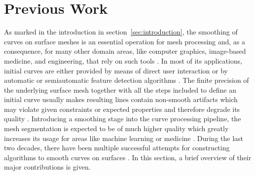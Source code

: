 \documentclass{stdlocal}
\begin{document}
\section{Previous Work} %
\label{sec:previous_work}

  As marked in the introduction in section~\ref{sec:introduction}, the smoothing of curves on surface meshes is an essential operation for mesh processing and, as a consequence, for many other domain areas, like computer graphics, image-based medicine, and engineering, that rely on such tools \autocite{ji2006,kaplansky2009}.
  In most of its applications, initial curves are either provided by means of direct user interaction or by automatic or semiautomatic feature detection algorithms \autocite{zachow2003,lawonn2014}.
  The finite precision of the underlying surface mesh together with all the steps included to define an initial curve usually makes resulting lines contain non-smooth artifacts which may violate given constraints or expected properties and therefore degrade its quality \autocite{kaplansky2009,lawonn2014}.
  Introducing a smoothing stage into the curve processing pipeline, the mesh segmentation is expected to be of much higher quality which greatly increases its usage for areas like machine learning \autocite{benhabiles2011} or medicine \autocite{zachow2003,alirr2019}.
  During the last two decades, there have been multiple successful attempts for constructing algorithms to smooth curves on surfaces \autocite{hofer2004,bischoff2005,lawonn2014,mancinelli2022}.
  In this section, a brief overview of their major contributions is given.
\end{document}
